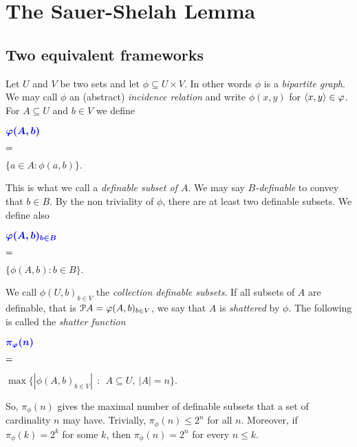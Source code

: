 \documentclass[sputnik.tex]{subfiles}
\begin{document}
\chapter{The Sauer-Shelah Lemma}
\label{sauer}

\def\vc{{\footnotesize VC}}
\def\nip{{\footnotesize NIP}}


\def\medrel#1{\parbox[t]{6ex}{$\displaystyle\hfil #1$}}
\def\ceq#1#2#3{\parbox[t]{25ex}{$\displaystyle #1$}\medrel{#2}{$\displaystyle #3$}}

\def\mr{\color{brown}}
\def\gr{\color{green}}

\section{Two equivalent frameworks}\label{vc_dimension}

Let $U$ and $V$ be two sets and let $\phi\subseteq U\times V$.
In other words $\phi$ is a \emph{bipartite graph}.
We may call $\phi$ an (abstract) \emph{incidence relation\/} and write $\phi(x,y)$ for $\<x,y\>\in\phi$.
For $A\subseteq U$ and $b\in V$ we define 

\ceq{\hfill\emph{$\phi(A,b)$}}{=}{\{a\in A:\phi(a,b)\}.} 

This is what we call a \emph{definable subset of $A$}.
We may say \emph{$B$-definable} to convey that $b\in B$.
By the non triviality of $\phi$, there are at least two definable subsets.
We define also

\ceq{\hfill\emph{$\phi(A,b)_{b\in B}$}}{=}{\{\phi(A,b) : b\in B\}.}

We call $\phi(U,b)_{b\in V}$ the \emph{collection definable subsets}.
If all subsets of $A$ are definable, that is $\P A=\phi(A,b)_{b\in V}$, we say that $A$ is \emph{shattered\/} by $\phi$.
The following is called the \emph{shatter function\/}

\ceq{\hfill\emph{$\pi_\phi(n)$}}{=}{\max\Big\{|\phi(A,b)_{b\in V}|\ \ :\ \ A\subseteq U,\ |A|=n\Big\}.}

So, $\pi_\phi(n)$ gives the maximal number of definable subsets that a set of cardinality $n$ may have.
Trivially, $\pi_\phi(n)\le2^n$ for all $n$.
Moreover, if $\pi_\phi(k)=2^k$ for some $k$, then  $\pi_\phi(n)=2^n$ for every $n\le k$.
\end{document}
